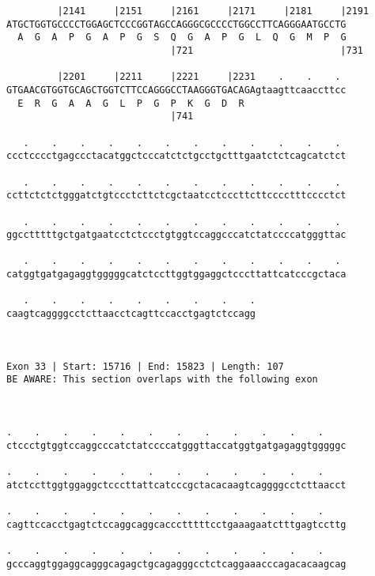 \documentclass{article}
\begin{document}
\begin{Verbatim}
         |2141     |2151     |2161     |2171     |2181     |2191
ATGCTGGTGCCCCTGGAGCTCCCGGTAGCCAGGGCGCCCCTGGCCTTCAGGGAATGCCTG
  A  G  A  P  G  A  P  G  S  Q  G  A  P  G  L  Q  G  M  P  G
                             |721                          |731
  
         |2201     |2211     |2221     |2231    .    .    . 
GTGAACGTGGTGCAGCTGGTCTTCCAGGGCCTAAGGGTGACAGAgtaagttcaaccttcc
  E  R  G  A  A  G  L  P  G  P  K  G  D  R                  
                             |741                           
  
   .    .    .    .    .    .    .    .    .    .    .    . 
ccctcccctgagccctacatggctcccatctctgcctgctttgaatctctcagcatctct
                                                            
   .    .    .    .    .    .    .    .    .    .    .    . 
ccttctctctgggatctgtccctcttctcgctaatcctcccttcttcccctttcccctct
                                                            
   .    .    .    .    .    .    .    .    .    .    .    . 
ggcctttttgctgatgaatcctctccctgtggtccaggcccatctatccccatgggttac
                                                            
   .    .    .    .    .    .    .    .    .    .    .    . 
catggtgatgagaggtgggggcatctccttggtggaggctcccttattcatcccgctaca
                                                            
   .    .    .    .    .    .    .    .    .
caagtcaggggcctcttaacctcagttccacctgagtctccagg
                                            
                                            
 
Exon 33 | Start: 15716 | End: 15823 | Length: 107
BE AWARE: This section overlaps with the following exon



.    .    .    .    .    .    .    .    .    .    .    .    
ctccctgtggtccaggcccatctatccccatgggttaccatggtgatgagaggtgggggc
                                                            
.    .    .    .    .    .    .    .    .    .    .    .    
atctccttggtggaggctcccttattcatcccgctacacaagtcaggggcctcttaacct
                                                            
.    .    .    .    .    .    .    .    .    .    .    .    
cagttccacctgagtctccaggcaggcaccctttttcctgaaagaatctttgagtccttg
                                                            
.    .    .    .    .    .    .    .    .    .    .    .    
gcccaggtggaggcagggcagagctgcagagggcctctcaggaaacccagacacaagcag
                                                            

\end{Verbatim}
\end{document}
